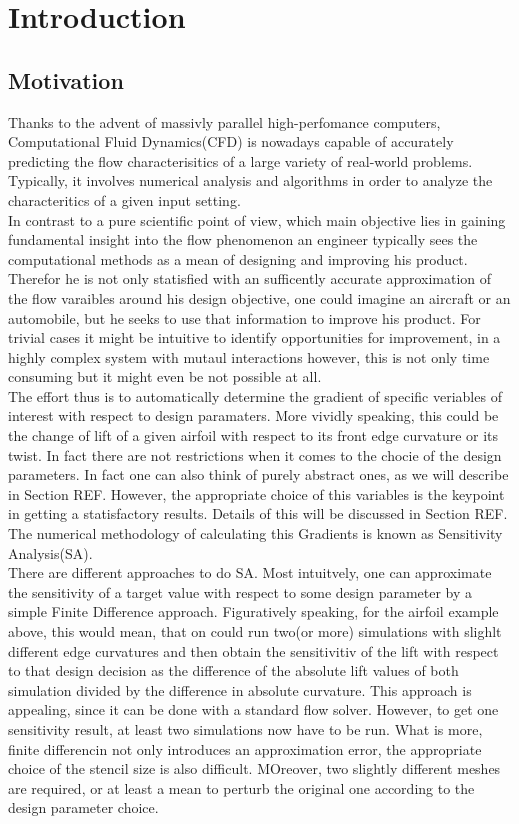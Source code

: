 
\section{Introduction}\label{chapt:introduction}


\subsection{Motivation}\label{sec:motivation}
Thanks to the advent of massivly parallel high-perfomance computers, Computational Fluid Dynamics(CFD) is nowadays capable of accurately predicting the flow characterisitics of a large variety of real-world problems. Typically, it involves numerical analysis and algorithms in order to analyze the characteritics of a given input setting.\\
In contrast to a pure scientific point of view, which main objective lies in gaining fundamental insight into the flow phenomenon an engineer typically sees the computational methods as a mean of designing and improving his product. Therefor he is not only statisfied with an sufficently accurate approximation of the flow varaibles around his design objective, one could imagine an aircraft or an automobile, but he seeks to use that information to improve his product.
For trivial cases it might be intuitive to identify opportunities for improvement, in a highly complex system with mutaul interactions however, this is not only time consuming but it might even be not possible at all.\\
The effort thus is to automatically determine the gradient of specific veriables of interest with respect to design paramaters. More vividly speaking, this could be the change of lift of a given airfoil with respect to its front edge curvature or its twist. In fact there are not restrictions when it comes to the chocie of the design parameters. In fact one can also think of purely abstract ones, as we will describe in Section REF. However, the appropriate choice of this variables is the keypoint in getting a statisfactory results. Details of this will be discussed in Section REF.
The numerical methodology of calculating this Gradients is known as Sensitivity Analysis(SA).\\
There are different approaches to do SA. Most intuitvely, one can approximate the sensitivity of a target value with respect to some design parameter by a simple Finite Difference approach. Figuratively speaking, for the airfoil example above, this would mean, that on could run two(or more) simulations with slighlt different edge curvatures and then obtain the sensitivitiv of the lift with respect to that design decision as the difference of the absolute lift values of both simulation divided by the difference in absolute curvature. This approach is appealing, since it can be done with a standard flow solver. However, to get one sensitivity result, at least two simulations now have to be run. What is more, finite differencin not only introduces an approximation error, the appropriate choice of the stencil size is also difficult. MOreover, two slightly different meshes are required, or at least a mean to perturb the original one according to the design parameter choice.\\
